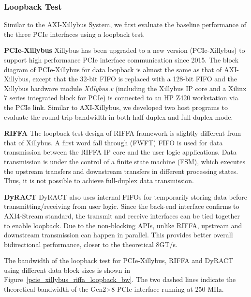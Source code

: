 \subsubsection{Loopback Test}
Similar to the AXI-Xillybus System, we first evaluate the baseline performance of the three PCIe interfaces using a loopback test. 

\noindent \textbf{PCIe-Xillybus}
Xillybus has been upgraded to a new version (PCIe-Xillybus) to support high performance PCIe interface communication since 2015. 
The block diagram of PCIe-Xillybus for data loopback is almost the same as that of AXI-Xillybus, except that the 32-bit FIFO is replaced with a 128-bit FIFO and the Xillybus hardware module \textit{Xillybus.v} (including the Xillybus IP core and a Xilinx 7 series integrated block for PCIe) is connected to an HP Z420 workstation via the PCIe link. 
Similar to AXI-Xillybus, we developed two host programs to evaluate the round-trip bandwidth in both half-duplex and full-duplex mode. 

\noindent \textbf{RIFFA}
The loopback test design of RIFFA framework is slightly different from that of Xillybus. 
A first word fall through (FWFT) FIFO is used for data transmission between the RIFFA IP core and the user logic applications. 
Data transmission is under the control of a finite state machine (FSM), which executes the upstream transfers and downstream transfers in different processing states.  
Thus, it is not possible to achieve full-duplex data transmission. 

\noindent \textbf{DyRACT}
DyRACT also uses internal FIFOs for temporarily storing data before transmitting/receiving from user logic.
Since the back-end interface confirms to AXI4-Stream standard, the transmit and receive interfaces can be tied together to enable loopback.
Due to the non-blocking APIs, unlike RIFFA, upstream and downstream transmission can happen in parallel.
This provides better overall bidirectional performance, closer to the theoretical 8GT/s.

The bandwidth of the loopback test for PCIe-Xillybus, RIFFA and DyRACT using different data block sizes is shown in Figure~\ref{pcie_xillybus_riffa_loopback_bw}. 
The two dashed lines indicate the theoretical bandwidth of the Gen2$\times$8 PCIe interface running at 250 MHz.



